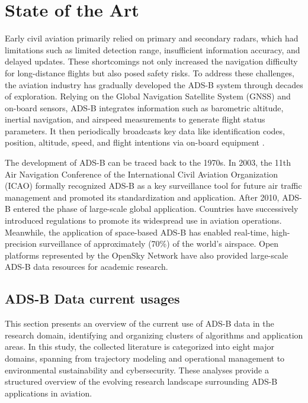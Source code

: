 \section{State of the Art}\label{soa}
Early civil aviation primarily relied on primary and secondary radars, which had limitations such as limited detection range, insufficient information accuracy, and delayed updates. These shortcomings not only increased the navigation difficulty for long-distance flights but also posed safety risks\cite{icao_1993}.
To address these challenges, the aviation industry has gradually developed the ADS-B system through decades of exploration. Relying on the Global Navigation Satellite System (GNSS) and on-board sensors, ADS-B integrates information such as barometric altitude, inertial navigation, and airspeed measurements to generate flight status parameters. It then periodically broadcasts key data like identification codes, position, altitude, speed, and flight intentions via on-board equipment \cite{olive2024filtering}.

The development of ADS-B can be traced back to the 1970s. In 2003, the 11th Air Navigation Conference of the International Civil Aviation Organization (ICAO) \cite{icao_2003} formally recognized ADS-B as a key surveillance tool for future air traffic management and promoted its standardization and application.
After 2010, ADS-B entered the phase of large-scale global application. Countries have successively introduced regulations to promote its widespread use in aviation operations. Meanwhile, the application of space-based ADS-B \cite{melero2024satera} has enabled real-time, high-precision surveillance of approximately (70\%) of the world's airspace. Open platforms represented by the OpenSky Network \cite{schafer2014bringing} have also provided large-scale ADS-B data resources for academic research.

\subsection{ADS-B Data current usages}

This section presents an overview of the current use of ADS-B data in the research domain, identifying and organizing clusters of algorithms and application areas. In this study, the collected literature is categorized into eight major domains, spanning from trajectory modeling and operational management to environmental sustainability and cybersecurity. These analyses provide a structured overview of the evolving research landscape surrounding ADS-B applications in aviation.

